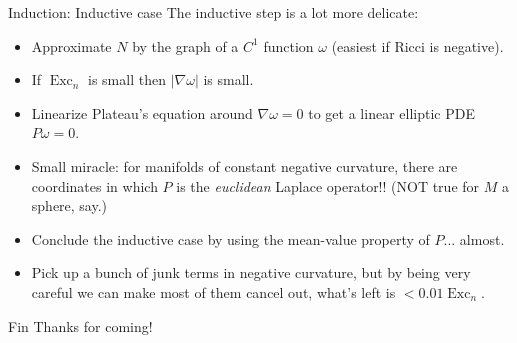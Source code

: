 \documentclass[10pt]{beamer}
\DeclareMathOperator{\Exc}{Exc}
\begin{document}
\begin{frame}{Induction: Inductive case}
The inductive step is a lot more delicate:\pause
\begin{itemize}
\item Approximate $N$ by the graph of a $C^1$ function $\omega$ (easiest if Ricci is negative). \pause
\item If $\Exc_n$ is small then $|\nabla \omega|$ is small.\pause
\item Linearize Plateau's equation around $\nabla \omega = 0$ to get a linear elliptic PDE $P\omega = 0$.\pause
\item Small miracle: for manifolds of constant negative curvature, there are coordinates in which $P$ is the \emph{euclidean} Laplace operator!! (NOT true for $M$ a sphere, say.)\pause
\item Conclude the inductive case by using the mean-value property of $P$... almost.\pause 
\item Pick up a bunch of junk terms in negative curvature, but by being very careful we can make most of them cancel out, what's left is $< 0.01\Exc_n$.
\end{itemize}
\end{frame}

\begin{frame}{Fin}
    Thanks for coming!
\end{frame}
\end{document}
